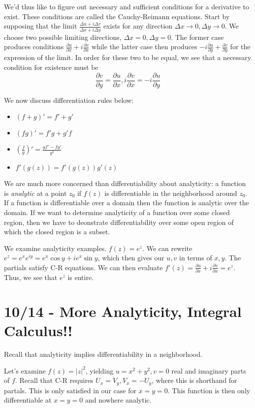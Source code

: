 \documentclass[10pt]{report}
\newcommand{\pd}[2]{\frac{\partial #1}{\partial#2}}
\begin{document}
We'd thus like to figure out necessary and sufficient conditions for a derivative to exist. These conditions are called the Cauchy-Reimann equations. Start by supposing that the limit $\frac{\Delta u + i \Delta v}{\Delta x + i \Delta y}$ exists for any direction $\Delta x \to 0, \Delta y \to 0$. We choose two possible limiting directions, $\Delta x = 0, \Delta y = 0$. The former case produces conditions $\pd{u}{x} + i\pd{v}{x}$ while the latter case then produces $-i\pd{u}{y} + \pd{v}{y}$ for the expression of the limit. In order for these two to be equal, we see that a necessary condition for existence must be
$$\pd{v}{y} = \pd{u}{x} , i\pd{v}{x}=-i\pd{u}{y}$$

We now discuss differentiation rules below:
\begin{itemize}
	\item $(f+g)' = f'+g'$
	\item $(fg)' = f'g + g'f$
	\item $(\frac{f}{g})' = \frac{gf'-fg'}{g^2}$
	\item $f'(g(z)) = f'(g(z)) g'(z)$
\end{itemize}
We are much more concerned than differentiability about analyticity: a function is \emph{analytic} at a point $z_0$ if $f(z)$ is differentiable in the neighborhood around $z_0$. If a function is differentiable over a domain then the function is analytic over the domain. If we want to determine analyticity of a function over some closed region, then we have to deonstrate differentiability over some open region of which the closed region is a subset.

We examine analyticity examples. $f(z) = e^z$. We can rewrite $e^z = e^xe^{iy} = e^x\cos y + i e^x\sin y$, which then gives our $u,v$ in terms of $x,y$. The partials satisfy C-R equations. We can then evaluate $f'(z) = \pd{u}{x} + i\pd{v}{x} = e^z$. Thus, we see that $e^z$ is entire.

\chapter{10/14 - More Analyticity, Integral Calculus!!}

Recall that analyticity implies differentiability in a neighborhood. 

Let's examine $f(z) = |z|^2$, yielding $u = x^2 + y^2, v = 0$ real and imaginary parts of $f$. Recall that C-R requires $U_x = V_y, V_x = -U_y$, where this is shorthand for partals. This is only satisfied in our case for $x=y=0$. This function is then only differentiable at $x=y=0$ and nowhere analytic.
\end{document}
